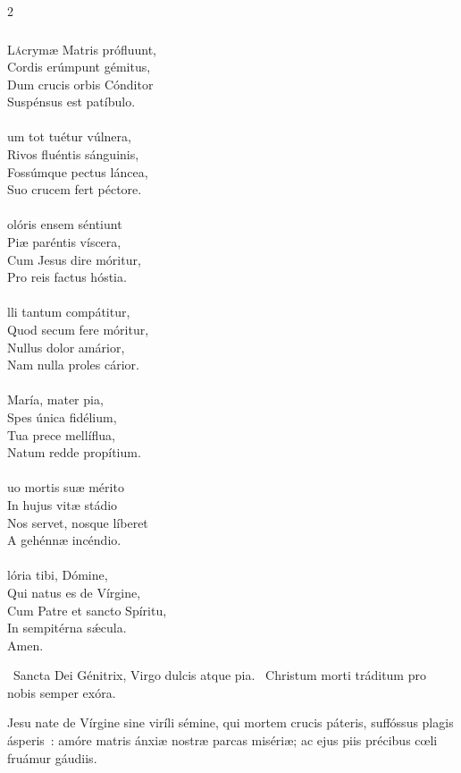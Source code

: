 \documentclass[9pt,twoside]{extarticle}
\begin{document}
\begin{multicols}{2}
\subsubsection*{\center {}}
\lettrine{L}ácrymæ Matris prófluunt,\\
Cordis erúmpunt gémitus,\\
Dum crucis orbis Cónditor\\
Suspénsus est patíbulo.\\
\\
um tot tuétur vúlnera,\\
Rivos fluéntis sánguinis,\\
Fossúmque pectus láncea,\\
Suo crucem fert péctore.\\
\\
olóris ensem séntiunt\\
Piæ paréntis víscera,\\
Cum Jesus dire móritur,\\
Pro reis factus hóstia.\\
\\
lli tantum compátitur,\\
Quod secum fere móritur,\\
Nullus dolor amárior,\\
Nam nulla proles cárior.\\
\\
 María, mater pia,\\
Spes única fidélium,\\
Tua prece mellíflua,\\
Natum redde propítium.\\
\\
uo mortis suæ mérito\\
In hujus vitæ stádio\\
Nos servet, nosque líberet\\
A gehénnæ incéndio.\\
\\
lória tibi, Dómine,\\
Qui natus es de Vírgine,\\
Cum Patre et sancto Spíritu,\\
In sempitérna sǽcula.\\
Amen.

\begin{tightlist}{}
\item {}
\item {}~Sancta Dei Génitrix, Virgo dulcis atque pia. ~Christum morti tráditum pro nobis semper exóra.
\item {} Jesu nate de Vírgine sine viríli sémine, qui mortem crucis páteris, suffóssus plagis ásperis~: amóre matris ánxiæ nostræ parcas misériæ; ac ejus piis précibus cœli fruámur gáudiis.
\end{tightlist}


\end{multicols}
\end{document}
